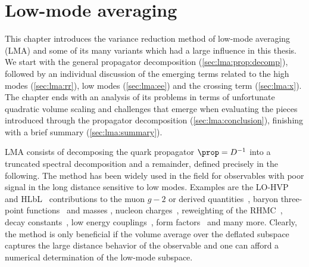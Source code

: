 \chapter{Low-mode averaging}
\label{ch:p2:lma}




This chapter introduces the variance reduction method of low-mode averaging~\cite{Neff_2001,DeGrand_2004,Giusti_2004} (LMA) and some of its many variants which had a large influence in this thesis.
We start with the general propagator decomposition (\cref{sec:lma:prop:decomp}), followed by an individual discussion of the emerging terms related to the high modes (\cref{sec:lma:rr}), low modes (\cref{sec:lma:ee}) and the crossing term (\cref{sec:lma:x}).
The chapter ends with an analysis of its problems in terms of unfortunate quadratic volume scaling and challenges that emerge when evaluating the pieces introduced through the propagator decomposition (\cref{sec:lma:conclusion}), finishing with a brief summary (\cref{sec:lma:summary}).


LMA consists of decomposing the quark propagator $\prop=D^{-1}$ into a truncated spectral decomposition and a remainder, defined precisely in the following.
The method has been widely used in the field for observables with poor signal in the long distance sensitive to low modes.
Examples are the LO-HVP~\cite{bmw_2024,Kuberski_2023,Aubin:2022hgm,Bazavov:2024eou,RBC_2024} and HLbL~\cite{Lin:2024khg} contributions to the muon $g-2$ or derived quantities~\cite{ExtendedTwistedMass:2025tpc}, baryon three-point functions~\cite{Yang:2015zja,Ohki:2012jyg} and masses \cite{Bali:2010se}, nucleon charges~\cite{Yamanaka:2018uud}, reweighting of the RHMC~\cite{Kuberski:2023zky}, decay constants~\cite{Bali:2014pva}, low energy couplings~\cite{Bernardoni:2011kd}, form factors~\cite{JLQCD:2009ofg} and many more.
Clearly, the method is only beneficial if the volume average over the deflated subspace captures the large distance behavior of the observable and one can afford a numerical determination of the low-mode subspace.

